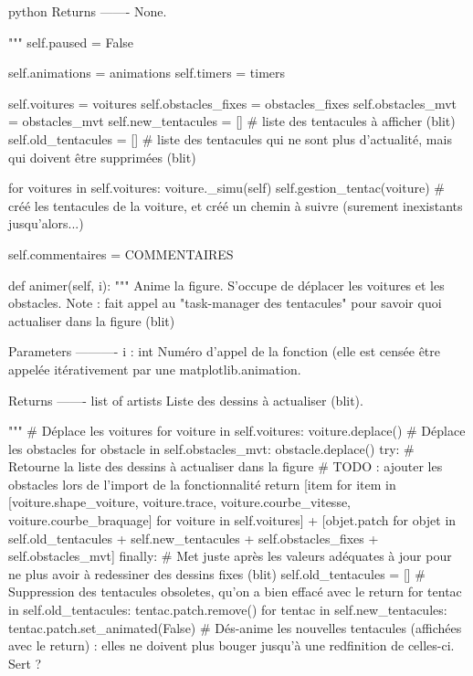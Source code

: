 \begin{mintedbox}{python}
        Returns
        -------
        None.

        """
        self.paused = False

        self.animations = animations
        self.timers = timers

        self.voitures = voitures
        self.obstacles_fixes = obstacles_fixes
        self.obstacles_mvt = obstacles_mvt
        self.new_tentacules = []  # liste des tentacules à afficher (blit)
        self.old_tentacules = []  # liste des tentacules qui ne sont plus d'actualité, mais qui doivent être supprimées (blit)

        for voitures in self.voitures:
            voiture._simu(self)
            self.gestion_tentac(voiture)  # créé les tentacules de la voiture, et créé un chemin à suivre (surement inexistants jusqu'alors...)

        self.commentaires = COMMENTAIRES

    def animer(self, i):
        """
        Anime la figure. S'occupe de déplacer les voitures et les obstacles.
        Note : fait appel au "task-manager des tentacules" pour savoir quoi actualiser dans la figure (blit)

        Parameters
        ----------
        i : int
            Numéro d'appel de la fonction (elle est censée être appelée itérativement par une matplotlib.animation.

        Returns
        -------
        list of artists
            Liste des dessins à actualiser (blit).

        """
        # Déplace les voitures
        for voiture in self.voitures:
            voiture.deplace()
        # Déplace les obstacles
        for obstacle in self.obstacles_mvt:
            obstacle.deplace()
        try:
            # Retourne la liste des dessins à actualiser dans la figure
            # TODO : ajouter les obstacles lors de l'import de la fonctionnalité
            return [item for item in [voiture.shape_voiture, voiture.trace, voiture.courbe_vitesse, voiture.courbe_braquage] for voiture in self.voitures] + [objet.patch for objet in self.old_tentacules + self.new_tentacules + self.obstacles_fixes + self.obstacles_mvt]
        finally:
            # Met juste après les valeurs adéquates à jour pour ne plus avoir à redessiner des dessins fixes (blit)
            self.old_tentacules = []  # Suppression des tentacules obsoletes, qu'on a bien effacé avec le return
            for tentac in self.old_tentacules:
                tentac.patch.remove()
            for tentac in self.new_tentacules:
                tentac.patch.set_animated(False)  # Dés-anime les nouvelles tentacules (affichées avec le return) : elles ne doivent plus bouger jusqu'à une redfinition de celles-ci. Sert ?


\end{mintedbox}
